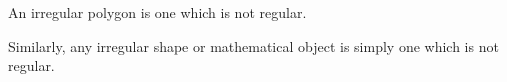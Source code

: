 An irregular polygon is one which is not regular.
\par
Similarly, any irregular shape or mathematical object
is simply one which is not regular.